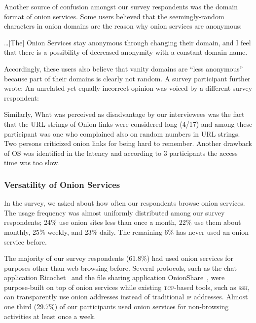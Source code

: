 Another source of confusion amongst our survey respondents was the domain format of
onion services.  Some users believed that the seemingly-random
characters in onion domains are the reason why onion services are anonymous:

\begin{displayquote}
\ldots [The] Onion Services stay anonymous through changing their domain, and I
feel that there is a possibility of decreased anonymity with a constant domain
name.
\end{displayquote}

Accordingly, these users also believe that vanity domains  are ``less anonymous''
because part of their domains is clearly not random.  A survey participant
further wrote:   An unrelated yet
equally incorrect opinion was voiced by a different survey respondent:

Similarly, What was perceived as disadvantage by our interviewees was the fact that the URL strings of Onion links were considered long (4/17) and among these participant was one who complained also on random numbers in URL strings. Two persons criticized onion links for being hard to remember. Another drawback of OS was identified in the latency and according to 3 participants the access time was too slow. 
\subsubsection{ Versatility of Onion Services }
In the survey, we asked about how often our respondents browse onion
services.  The usage frequency was almost uniformly distributed among our survey
respondents; 24\% use onion sites less than once a month, 22\% use them about
monthly, 25\% weekly, and 23\% daily.  The remaining 6\% has never used an onion
service before.

The majority of our survey respondents (61.8\%) had used onion services for purposes
other than web browsing before.  Several protocols, such as the chat application
Ricochet~\cite{ricochet} and the file sharing application
OnionShare~\cite{onionshare}, were purpose-built on top of onion services while
existing \textsc{tcp}-based tools, such as \textsc{ssh}, can transparently use
onion addresses instead of traditional \textsc{ip} addresses.  Almost one third
(29.7\%) of our participants used onion services for non-browsing activities at
least once a week. 

